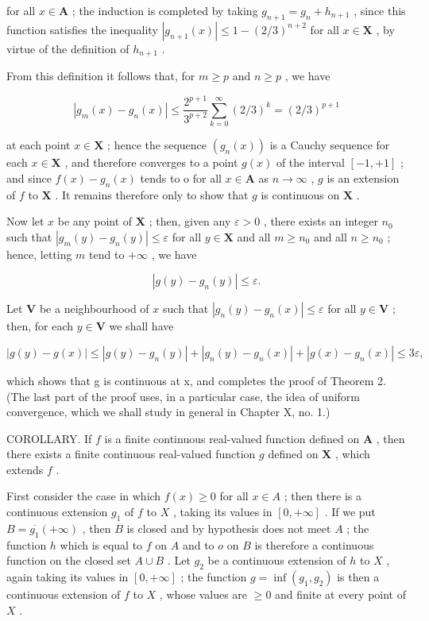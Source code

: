 for all \(x \in \mathbf{A}\) ; the induction is completed by taking \(g_{n+1} = g_n + h_{n+1}\) , since this function satisfies the inequality \(|g_{n+1}(x)| \leqslant 1 - (2/3)^{n+2}\) for all \(x \in \mathbf{X}\) , by virtue of the definition of \(h_{n+1}\) .

From this definition it follows that, for \(m \geqslant p\) and \(n \geqslant p\) , we have

\[
\left| g _ {m} (x) - g _ {n} (x) \right| \leqslant \frac {2 ^ {p + 1}}{3 ^ {p + 2}} \sum_ {k = 0} ^ {\infty} (2 / 3) ^ {k} = (2 / 3) ^ {p + 1}
\]

at each point \(x \in \mathbf{X}\) ; hence the sequence \((g_n(x))\) is a Cauchy sequence for each \(x \in \mathbf{X}\) , and therefore converges to a point \(g(x)\) of the interval \([-1, +1]\) ; and since \(f(x) - g_n(x)\) tends to o for all \(x \in \mathbf{A}\) as \(n \to \infty\) , \(g\) is an extension of \(f\) to \(\mathbf{X}\) . It remains therefore only to show that \(g\) is continuous on \(\mathbf{X}\) .

Now let \(x\) be any point of \(\mathbf{X}\) ; then, given any \(\varepsilon > 0\) , there exists an integer \(n_0\) such that \(|g_m(y) - g_n(y)| \leqslant \varepsilon\) for all \(y \in \mathbf{X}\) and all \(m \geqslant n_0\) and all \(n \geqslant n_0\) ; hence, letting \(m\) tend to \(+\infty\) , we have

\[
\left| g (y) - g _ {n} (y) \right| \leqslant \varepsilon .
\]

Let \(\mathbf{V}\) be a neighbourhood of \(x\) such that \(|g_n(y) - g_n(x)| \leqslant \varepsilon\) for all \(y \in \mathbf{V}\) ; then, for each \(y \in \mathbf{V}\) we shall have

\[
\left| g (y) - g (x) \right| \leqslant \left| g (y) - g _ {n} (y) \right| + \left| g _ {n} (y) - g _ {n} (x) \right| + \left| g (x) - g _ {n} (x) \right| \leqslant 3 \varepsilon ,
\]

which shows that g is continuous at x, and completes the proof of Theorem 2. (The last part of the proof uses, in a particular case, the idea of uniform convergence, which we shall study in general in Chapter X, no. 1.)

COROLLARY. If \(f\) is a finite continuous real-valued function defined on \(\mathbf{A}\) , then there exists a finite continuous real-valued function \(g\) defined on \(\mathbf{X}\) , which extends \(f\) .

First consider the case in which \(f(x) \geqslant 0\) for all \(x \in A\) ; then there is a continuous extension \(g_1\) of \(f\) to \(X\) , taking its values in \([0, +\infty]\) . If we put \(B = \overline{g_1} (+\infty)\) , then \(B\) is closed and by hypothesis does not meet \(A\) ; the function \(h\) which is equal to \(f\) on \(A\) and to \(o\) on \(B\) is therefore a continuous function on the closed set \(A \cup B\) . Let \(g_2\) be a continuous extension of \(h\) to \(X\) , again taking its values in \([0, +\infty]\) ; the function \(g = \inf(g_1, g_2)\) is then a continuous extension of \(f\) to \(X\) , whose values are \(\geqslant 0\) and finite at every point of \(X\) .

